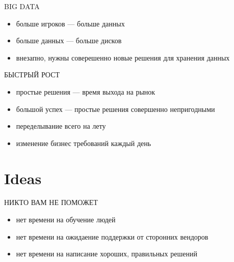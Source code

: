 \documentclass[aspectratio=169]{beamer}
\begin{document}
\begin{frame}{BIG DATA}
    \begin{itemize}
        \item больше игроков --- больше данных
        \item больше данных --- больше дисков
        \item внезапно, нужны соверешенно новые решения для хранения данных
    \end{itemize}
\end{frame}

\begin{frame}{БЫСТРЫЙ РОСТ}
    \begin{itemize}
        \item простые решения --- время выхода на рынок
        \item большой успех --- простые решения совершенно непригодными
        \item переделывание всего на лету
        \item изменение бизнес требований каждый день
    \end{itemize}
\end{frame}

\section{Ideas}
{
\begin{frame}[plain]{}
\end{frame}
}
\begin{frame}{НИКТО ВАМ НЕ ПОМОЖЕТ}
    \begin{itemize}
        \item нет времени на обучение людей
        \item нет времени на ожидаение поддержки от сторонних вендоров
        \item нет времени на написание хороших, правильных решений
    \end{itemize}
\end{frame}
\end{document}
